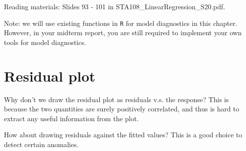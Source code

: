 \documentclass[12pt,]{book}
\newenvironment{Shaded}{\begin{snugshade}}{\end{snugshade}}
\newcommand{\KeywordTok}[1]{\textcolor[rgb]{0.13,0.29,0.53}{\textbf{#1}}}
\newcommand{\DataTypeTok}[1]{\textcolor[rgb]{0.13,0.29,0.53}{#1}}
\newcommand{\DecValTok}[1]{\textcolor[rgb]{0.00,0.00,0.81}{#1}}
\newcommand{\StringTok}[1]{\textcolor[rgb]{0.31,0.60,0.02}{#1}}
\newcommand{\CommentTok}[1]{\textcolor[rgb]{0.56,0.35,0.01}{\textit{#1}}}
\newcommand{\OperatorTok}[1]{\textcolor[rgb]{0.81,0.36,0.00}{\textbf{#1}}}
\newcommand{\NormalTok}[1]{#1}
\begin{document}
Reading materials: Slides 93 - 101 in STA108\_LinearRegression\_S20.pdf.

Note: we will use existing functions in \texttt{R} for model diagnostics
in this chapter. However, in your midterm report, you are still required
to implement your own tools for model diagnostics.

\section{Residual plot}\label{residual-plot}

\begin{Shaded}
\end{Shaded}

Why don't we draw the residual plot as residuals v.s. the response? This
is because the two quantities are surely positively correlated, and thus
is hard to extract any useful information from the plot.

\begin{Shaded}
\end{Shaded}

How about drawing residuals against the fitted values? This is a good
choice to detect certain anomalies.
\end{document}
